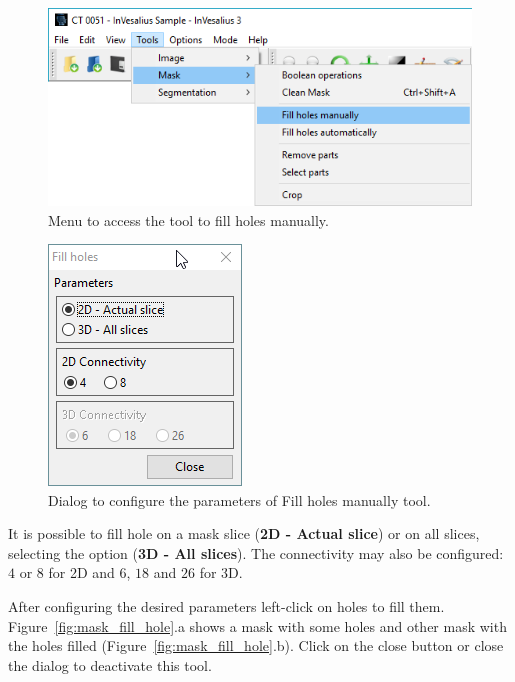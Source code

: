 \begin{figure}[!htb]
\centering
\includegraphics[scale=0.4]{../user_guide_figures/invesalius_screen/menu_mask_manual_fill_holes_en.png}
\caption{Menu to access the tool to fill holes manually.}
\label{fig:menu_mask_manual_fill_holes}
\end{figure}

\begin{figure}[!htb]
\centering
\includegraphics[scale=0.7]{../user_guide_figures/invesalius_screen/mask_manual_fill_holes_window_en.png}
\caption{Dialog to configure the parameters of Fill holes manually tool.}
\label{fig:mask_manual_fill_holes_window}
\end{figure}

It is possible to fill hole on a mask slice (\textbf{2D - Actual slice}) or on all slices, selecting the option (\textbf{3D - All slices}). The connectivity may also be configured: $4$ or $8$ for 2D and $6$, $18$ and $26$ for 3D.

After configuring the desired parameters left-click on holes to fill them. Figure~\ref{fig:mask_fill_hole}.a shows a mask with some holes and other mask with the holes filled (Figure~\ref{fig:mask_fill_hole}.b). Click on the close button or close the dialog to deactivate this tool.

